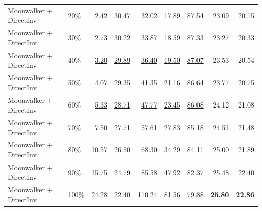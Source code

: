 \documentclass[10pt]{article}
\begin{document}
\begin{table}[htbp]
{\begin{tabular}{llrrrrrrr}
Moonwalker + DirectInv & 20\% & \underline{2.42} & \underline{30.47} & \underline{32.02} & \underline{17.89} & \underline{87.54} & 23.09 & 20.15 \\
Moonwalker + DirectInv & 30\% & \underline{2.73} & \underline{30.22} & \underline{33.87} & \underline{18.59} & \underline{87.33} & 23.27 & 20.33 \\
Moonwalker + DirectInv & 40\% & \underline{3.20} & \underline{29.89} & \underline{36.40} & \underline{19.50} & \underline{87.07} & 23.53 & 20.54 \\
Moonwalker + DirectInv & 50\% & \underline{4.07} & \underline{29.35} & \underline{41.35} & \underline{21.16} & \underline{86.64} & 23.77 & 20.75 \\
Moonwalker + DirectInv & 60\% & \underline{5.33} & \underline{28.71} & \underline{47.77} & \underline{23.45} & \underline{86.08} & 24.12 & 21.08 \\
Moonwalker + DirectInv & 70\% & \underline{7.50} & \underline{27.71} & \underline{57.61} & \underline{27.83} & \underline{85.18} & 24.51 & 21.48 \\
Moonwalker + DirectInv & 80\% & \underline{10.57} & \underline{26.50} & \underline{68.30} & \underline{34.29} & \underline{84.11} & 25.00 & 21.89 \\
Moonwalker + DirectInv & 90\% & \underline{15.75} & \underline{24.79} & \underline{85.58} & \underline{47.92} & \underline{82.37} & 25.48 & 22.40 \\
Moonwalker + DirectInv & 100\% & 24.28 & 22.40 & 110.24 & 81.56 & 79.88 & \underline{\textbf{25.80}} & \underline{\textbf{22.86}} \\
\bottomrule
\end{tabular}}
\end{table}
\clearpage
\end{document}
